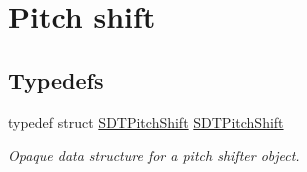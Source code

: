 \hypertarget{group__pitchshift}{}\section{Pitch shift}
\label{group__pitchshift}
\subsection*{Typedefs}
\begin{DoxyCompactItemize}
\item 
\hypertarget{group__pitchshift_ga7dff86b6eec0359c1234a618d7880fc8}{}typedef struct \hyperlink{group__pitchshift_ga7dff86b6eec0359c1234a618d7880fc8}{S\+D\+T\+Pitch\+Shift} \hyperlink{group__pitchshift_ga7dff86b6eec0359c1234a618d7880fc8}{S\+D\+T\+Pitch\+Shift}\label{group__pitchshift_ga7dff86b6eec0359c1234a618d7880fc8}

\begin{DoxyCompactList}\small\item\em Opaque data structure for a pitch shifter object. \end{DoxyCompactList}\end{DoxyCompactItemize}
